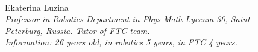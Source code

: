 \begin{figure}[H]
\begin{minipage}[h]{0.47\linewidth}
		\\
	\end{minipage}
	\hfill
	\begin{minipage}{0.47\linewidth}
		Ekaterina Luzina \\
		\emph{Professor in Robotics Department in Phys-Math Lyceum 30, Saint-Peterburg, Russia. Tutor of FTC team. \\}
		\emph{Information: 26 years old, in robotics 5 years, in FTC 4 years.}
	\end{minipage}
\end{figure}

